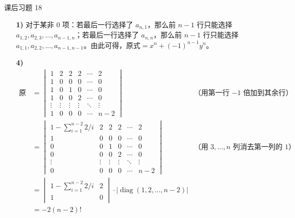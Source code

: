 \begin{problem}
	课后习题 18
	\begin{solution}
		\begin{enumerate}
			\item[\textbf{1)}] 对于某非 $0$ 项：若最后一行选择了 $a_{n,1}$，那么前 $n-1$ 行只能选择 $a_{1,2},a_{2,3},\dots,a_{n-1,n}$；若最后一行选择了 $a_{n,n}$，那么前 $n-1$ 行只能选择 $a_{1,1},a_{2,2},\dots,a_{n-1,n-1}$。由此可得，$\text{原式} = x^n + (-1)^{n-1} y^n$。

			\item[\textbf{4)}]
			$$
			\begin{aligned}
				\text{原式} & = \begin{vmatrix}
					1 & 2 & 2 & 2 & \cdots & 2 \\
					1 & 0 & 0 & 0 & \cdots & 0 \\
					1 & 0 & 1 & 0 & \cdots & 0 \\
					1 & 0 & 0 & 2 & \cdots & 0 \\
					\vdots & \vdots & \vdots & \vdots & \ddots & \vdots \\
					1 & 0 & 0 & 0 & \cdots & n-2
				\end{vmatrix} & \text{（用第一行 $-1$ 倍加到其余行）} \\
				& = \begin{vmatrix}
					1 - \sum_{i=1}^{n-2} 2/i & 2 & 2 & 2 & \cdots & 2 \\
					1 & 0 & 0 & 0 & \cdots & 0 \\
					0 & 0 & 1 & 0 & \cdots & 0 \\
					0 & 0 & 0 & 2 & \cdots & 0 \\
					\vdots & \vdots & \vdots & \vdots & \ddots & \vdots \\
					0 & 0 & 0 & 0 & \cdots & n-2
				\end{vmatrix} & \text{（用 $3,\dots,n$ 列消去第一列的 $1$）} \\
				& = \begin{vmatrix}
					1 - \sum_{i=1}^{n-2} 2/i & 2 \\
					1 & 0
				\end{vmatrix} \cdot |\operatorname{diag}(1,2,\dots,n-2)| \\
				& = -2(n-2)!
			\end{aligned}
			$$
		\end{enumerate}
	\end{solution}
\end{problem}

